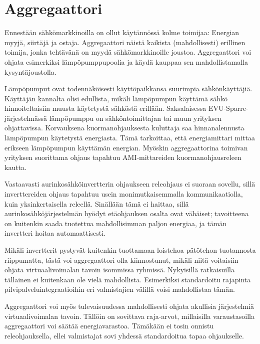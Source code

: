 \section{Aggregaattori}

  Ennestään sähkömarkkinoilla on ollut käytännössä kolme toimijaa: Energian myyjä, siirtäjä ja ostaja. Aggregaattori näistä kaikista (mahdollisesti) erillinen toimija, jonka tehtävänä on myydä sähkömarkkinoille joustoa. Aggregaattori voi ohjata esimerkiksi lämpöpumppupoolia ja käydä kauppaa sen mahdollistamalla kysyntäjoustolla.

  Lämpöpumput ovat todennäköisesti käyttöpaikkansa suurimpia sähkönkäyttäjiä. Käyttäjän kannalta olisi edullista, mikäli lämpöpumpun käyttämä sähkö hinnoiteltaisiin muusta käytetystä sähköstä erillään. Saksalaisessa EVU-Sparre-järjestelmässä lämpöpumppu on sähköntoimittajan tai muun yrityksen ohjattavissa. Korvauksena kuormanohjauksesta kuluttaja saa hinnanalennusta lämpöpumpun käytetystä energiasta. Tämä tarkoittaa, että energiamittari mittaa erikseen lämpöpumpun käyttämän energian. Myöskin aggregaattorina toimivan yrityksen suorittama ohjaus tapahtuu AMI-mittareiden kuormanohjausreleen kautta. \parencite{enwg, VDEARN4100}

  Vastaavasti aurinkosähköinvertterin ohjaukseen releohjaus ei suoraan sovellu, sillä inverttereiden ohjaus tapahtuu usein monimutkaisemmalla kommunikaatiolla, kuin yksinkertaisella releellä. Sinällään tämä ei haittaa, sillä aurinkosähköjärjestelmän hyödyt etäohjauksen osalta ovat vähäiset; tavoitteena on kuitenkin saada tuotettua mahdollisimman paljon energiaa, ja tämän invertteri hoitaa automaattisesti.

  Mikäli invertterit pystyvät kuitenkin tuottamaan loistehoa pätötehon tuotannosta riippumatta, tästä voi aggregaattori olla kiinnostunut, mikäli niitä voitaisiin ohjata virtuaalivoimalan tavoin isommissa ryhmissä. Nykyisillä ratkaisuilla tällainen ei kuitenkaan ole vielä mahdollista. Esimerkiksi standardoitu rajapinta pilvipalveluintegraatioihin eri valmistajien välillä voisi mahdollistaa tämän.

  Aggregaattori voi myös tulevaisuudessa mahdollisesti ohjata akullisia järjestelmiä virtuaalivoimalan tavoin. Tällöin on sovittava raja-arvot, millaisilla varaustasoilla aggregaattori voi säätää energiavarastoa. Tämäkään ei tosin onnistu releohjauksella, ellei valmistajat sovi yhdessä standardoitua tapaa ohjaukselle.
